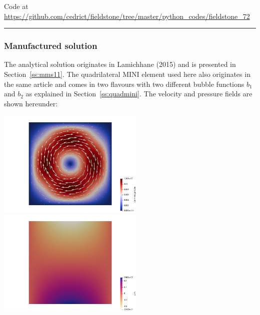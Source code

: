 

\begin{center}
Code at \url{https://github.com/cedrict/fieldstone/tree/master/python_codes/fieldstone_72}
\end{center}

\par\noindent\rule{\textwidth}{0.4pt}


\subsubsection*{Manufactured solution}

The analytical solution originates in Lamichhane (2015) \cite{lami15} and is 
presented in Section~\ref{ss:mms11}. 
The quadrilateral MINI element used here also originates in the same article 
and comes in two flavours with two different bubble functions $b_1$ and $b_2$
as explained in Section~\ref{ss:quadmini}.
The velocity and pressure fields are shown hereunder:

\begin{center}
\includegraphics[width=7cm]{python_codes/fieldstone_72/results/mms/vel}
\includegraphics[width=7cm]{python_codes/fieldstone_72/results/mms/p}
\end{center}

